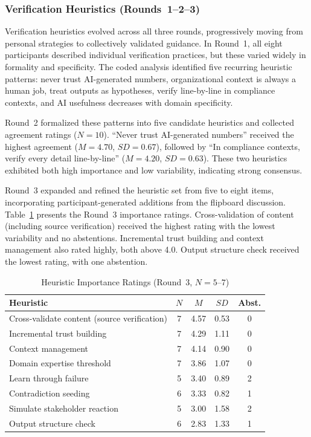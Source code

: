 \subsubsection{Verification Heuristics (Rounds~1--2--3)}\label{subsubsec:heuristics}

Verification heuristics evolved across all three rounds, progressively moving
from personal strategies to collectively validated guidance. In Round~1, all
eight participants described individual verification practices, but these varied
widely in formality and specificity. The coded analysis identified five recurring
heuristic patterns: never trust AI-generated numbers, organizational context is
always a human job, treat outputs as hypotheses, verify line-by-line in
compliance contexts, and AI usefulness decreases with domain specificity.

Round~2 formalized these patterns into five candidate heuristics and collected
agreement ratings ($N = 10$). ``Never trust AI-generated numbers'' received the
highest agreement ($M = 4.70$, $SD = 0.67$), followed by ``In compliance
contexts, verify every detail line-by-line'' ($M = 4.20$, $SD = 0.63$). These
two heuristics exhibited both high importance and low variability, indicating
strong consensus.

Round~3 expanded and refined the heuristic set from five to eight items,
incorporating participant-generated additions from the flipboard discussion.
Table~\ref{tab:heuristic-importance} presents the Round~3 importance ratings.
Cross-validation of content (including source verification) received the
highest rating with the lowest variability and no abstentions. Incremental trust
building and context management also rated highly, both above 4.0. Output
structure check received the lowest rating, with one abstention.

\begin{table}[!ht]
    \centering
    \caption{Heuristic Importance Ratings (Round~3, $N = 5$--$7$)}\label{tab:heuristic-importance}
    \begin{tabular}{|p{6.5cm}|c|c|c|c|}
        \hline
        \textbf{Heuristic} & \textbf{$N$} & \textbf{$M$} & \textbf{$SD$} & \textbf{Abst.} \\
        \hline
        Cross-validate content (source verification) & 7 & 4.57 & 0.53 & 0 \\
        \hline
        Incremental trust building & 7 & 4.29 & 1.11 & 0 \\
        \hline
        Context management & 7 & 4.14 & 0.90 & 0 \\
        \hline
        Domain expertise threshold & 7 & 3.86 & 1.07 & 0 \\
        \hline
        Learn through failure & 5 & 3.40 & 0.89 & 2 \\
        \hline
        Contradiction seeding & 6 & 3.33 & 0.82 & 1 \\
        \hline
        Simulate stakeholder reaction & 5 & 3.00 & 1.58 & 2 \\
        \hline
        Output structure check & 6 & 2.83 & 1.33 & 1 \\
        \hline
    \end{tabular}
\end{table}

